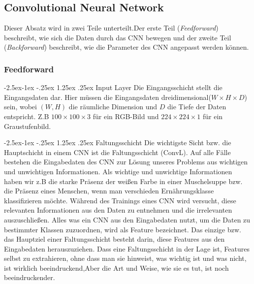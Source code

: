 \documentclass[12pt,a4paper]{scrartcl}
\makeatletter
\numberwithin{equation}{section}
\renewcommand\paragraph{\@startsection{paragraph}{4}{\z@}%
	{-2.5ex\@plus -1ex \@minus -.25ex}%
	{1.25ex \@plus .25ex}%
	{\normalfont\normalsize\bfseries}}
\makeatother
\begin{document}
\subsection{Convolutional Neural Network}
Dieser Absatz wird in zwei Teile unterteilt.Der erste Teil (\textit{Feedforward}) beschreibt, wie sich die Daten durch das \ac{CNN} bewegen und der zweite Teil (\textit{Backforward}) beschreibt, wie die Parameter des \ac{CNN} angepasst werden können.
\subsubsection{Feedforward }

\paragraph{Input Layer}\label{InputLayer}
Die Eingangsschicht stellt die Eingangsdaten dar. Hier müssen die Eingangsdaten dreidimensional($ W\times H\times D $) sein, wobei $ (W, H) $ die räumliche Dimension und $ D $ die Tiefe der Daten entspricht. Z.B  $ 100\times100 \times3 $ für ein RGB-Bild und $ 224\times224\times1 $ für ein Graustufenbild.


\paragraph{Faltungsschicht}\label{ConvL}
Die wichtigste Sicht bzw. die Hauptschicht in einem \ac{CNN} ist die Faltungsschicht (\ac{ConvL}).
Auf alle Fälle bestehen die Eingabedaten des \ac{CNN} zur Lösung unseres Problems aus wichtigen und unwichtigen Informationen. Als wichtige und unwichtige Informationen haben wir z.B die starke Präsenz der weißen Farbe in einer Muschelsuppe bzw. die Präsenz eines Menschen, wenn man verschieden Ernährungsklasse klassifizieren möchte. Während des Trainings eines \ac{CNN} wird versucht, diese relevanten Informationen aus den Daten zu entnehmen und die irrelevanten auszuschließen. Alles was ein \ac{CNN} aus den Eingabedaten nutzt, um die Daten zu bestimmter Klassen zuzuordnen, wird als Feature bezeichnet.
Das einzige bzw. das Hauptziel einer Faltungsschicht besteht darin, diese Features aus den Eingabedaten herauszuziehen.
Dass eine Faltungsschicht in der Lage ist, Features selbst zu extrahieren, ohne dass man sie hinweist, was wichtig ist und was nicht, ist wirklich beeindruckend,Aber die Art und Weise, wie sie es tut, ist noch beeindruckender.
\end{document}
